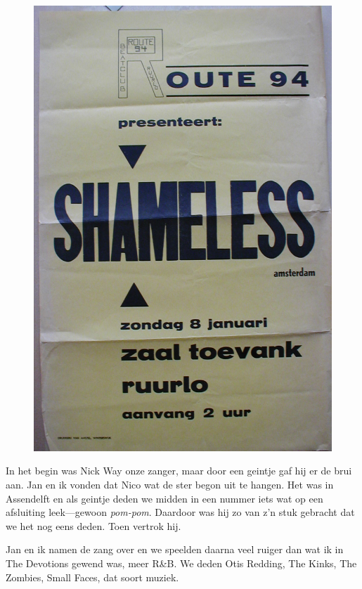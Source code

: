 \documentclass[10pt,twoside, openright]{memoir}
\begin{document}
\begin{figure}
\includegraphics[width=\textwidth]{img/170biljet}
\end{figure}

In het begin was Nick Way onze zanger, maar door een geintje gaf hij er de brui aan. Jan en ik  vonden dat Nico wat de ster begon uit te hangen. Het was in Assendelft en als geintje deden we midden in een nummer iets wat op een afsluiting leek---gewoon \emph{pom-pom}. Daardoor was hij zo van z’n stuk gebracht dat we het nog eens deden. Toen vertrok hij.

Jan en ik namen de zang over en we speelden daarna veel ruiger dan wat ik in The Devotions gewend was, meer R&B. We deden Otis Redding, The Kinks, The Zombies, Small Faces, dat soort muziek.
\end{document}
